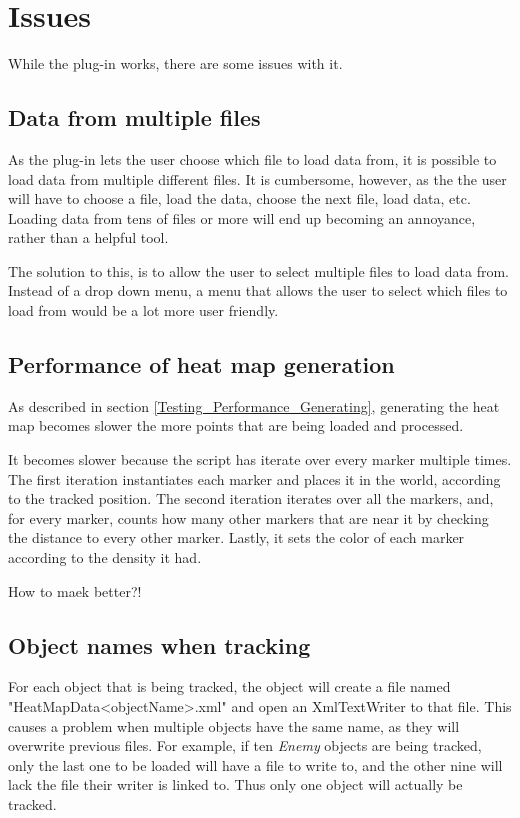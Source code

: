 \section{Issues}
\label{Issues}

While the plug-in works, there are some issues with it.

\subsection{Data from multiple files}
\label{Issues_MoreFiles}

As the plug-in lets the user choose which file to load data from, it is possible to load data from multiple different files. It is cumbersome, however, as the the user will have to choose a file, load the data, choose the next file, load data, etc. Loading data from tens of files or more will end up becoming an annoyance, rather than a helpful tool.

The solution to this, is to allow the user to select multiple files to load data from. Instead of a drop down menu, a menu that allows the user to select which files to load from would be a lot more user friendly.

\subsection{Performance of heat map generation}
\label{Issues_GenerationPerformance}

As described in section \ref{Testing_Performance_Generating}, generating the heat map becomes slower the more points that are being loaded and processed. 

It becomes slower because the script has iterate over every marker multiple times. The first iteration instantiates each marker and places it in the world, according to the tracked position. The second iteration iterates over all the markers, and, for every marker, counts how many other markers that are near it by checking the distance to every other marker. Lastly, it sets the color of each marker according to the density it had.

How to maek better?!

\subsection{Object names when tracking}
\label{Issues_UniqueNames}

For each object that is being tracked, the object will create a file named "HeatMapData<objectName>.xml" and open an XmlTextWriter to that file. This causes a problem when multiple objects have the same name, as they will overwrite previous files. For example, if ten \textit{Enemy} objects are being tracked, only the last one to be loaded will have a file to write to, and the other nine will lack the file their writer is linked to. Thus only one object will actually be tracked.

